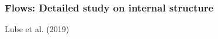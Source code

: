 \documentclass{beamer}
\begin{document}
\begin{frame}
  \frametitle{Flows: Detailed study on internal structure}

  \begin{center}
    \footnotesize Lube et al. (2019)
  \end{center}

\end{frame}
\end{document}
